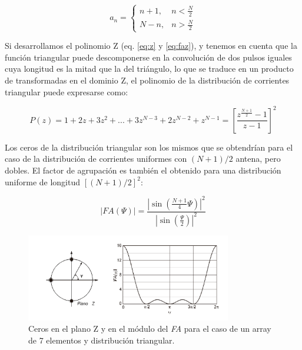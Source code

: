 \begin{equation}
	a_{n}=\begin{cases} n+1, &  n< \frac{N}{2} \\ N-n, & n> \frac{N}{2} \end{cases}
	\label{eq:casotriang}
\end{equation}

\par Si desarrollamos el polinomio Z (eq. \ref{eq:z} y \ref{eq:faz}), y tenemos en cuenta que la función triangular puede descomponerse en la convolución de dos pulsos iguales cuya longitud es la mitad que la del triángulo, lo que se traduce en un producto de transformadas en el dominio Z, el polinomio de la distribución de corrientes triangular puede expresarse como: \cite{Cardama2002}

\begin{equation}
	P(z)=1+2z+3z^{2}+...+3z^{N-3}+2z^{N-2}+z^{N-1}=\left [ \frac{z^{\frac{N+1}{2}}-1}{z-1} \right ]^{2}
	\label{eq:casotriangpoli}
\end{equation}

\par Los ceros de la distribución triangular son los mismos que se obtendrían para el caso de la distribución de corrientes uniformes con $(N+1)/2$ antena, pero dobles. El factor de agrupación es también el obtenido para una distribución uniforme de longitud $[(N+1)/2]^{2}$: \cite{Cardama2002}

\begin{equation}
	\left | FA (\Psi) \right |=\frac{\left |  \sin\left ( \frac{N+1}{4}\Psi \right )\right |^{2}}{\left | \sin\left ( \frac{\Psi}{2} \right ) \right |^{2}}
	\label{eq:fa2}
\end{equation}

\begin{figure}[h]
    \centering
        \includegraphics[width=0.8\textwidth]{archivos/array/triangular}
        \caption{Ceros en el plano Z y en el módulo del \textit{FA} para el caso de un array de 7 elementos y distribución triangular. \citep{Cardama2002}}
        \label{fig:cerostrinagular}
\end{figure}

